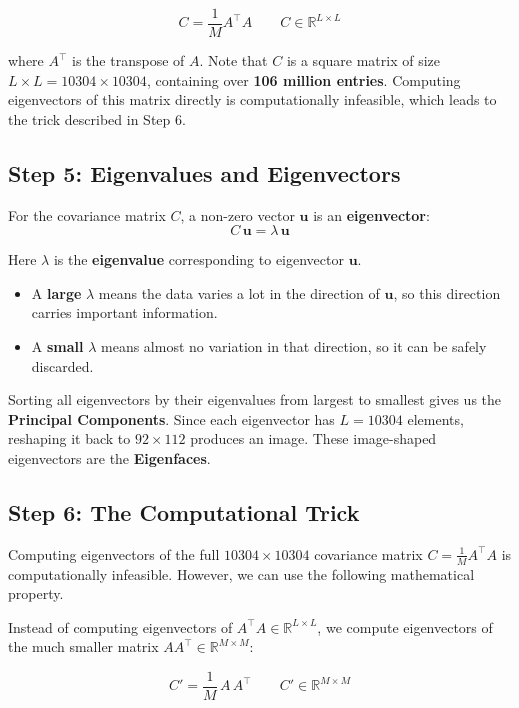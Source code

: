 \documentclass[12pt,a4paper]{article}
\begin{document}
\[
C = \frac{1}{M} A^\top A \qquad C \in \mathbb{R}^{L \times L}
\]

where $A^\top$ is the transpose of $A$. Note that $C$ is a square matrix of size
$L \times L = 10304 \times 10304$, containing over \textbf{106 million entries}.
Computing eigenvectors of this matrix directly is computationally infeasible,
which leads to the trick described in Step 6.

\subsection{Step 5: Eigenvalues and Eigenvectors}

For the covariance matrix $C$, a non-zero vector $\mathbf{u}$ is an
\textbf{eigenvector}:
\[
C\,\mathbf{u} = \lambda\,\mathbf{u}
\]

Here $\lambda$ is the \textbf{eigenvalue} corresponding to eigenvector $\mathbf{u}$.

\begin{itemize}
    \item A \textbf{large} $\lambda$ means the data varies a lot in the direction
          of $\mathbf{u}$, so this direction carries important information.
    \item A \textbf{small} $\lambda$ means almost no variation in that direction,
          so it can be safely discarded.
\end{itemize}

Sorting all eigenvectors by their eigenvalues from largest to smallest gives us
the \textbf{Principal Components}.
Since each eigenvector has $L = 10304$ elements, reshaping it back to $92 \times 112$
produces an image. These image-shaped eigenvectors are the \textbf{Eigenfaces}.

\subsection{Step 6: The Computational Trick}

Computing eigenvectors of the full $10304 \times 10304$ covariance matrix
$C = \frac{1}{M} A^\top A$ is computationally infeasible. However, we can use the
following mathematical property.

Instead of computing eigenvectors of $A^\top A \in \mathbb{R}^{L \times L}$,
we compute eigenvectors of the much smaller matrix $A A^\top \in \mathbb{R}^{M \times M}$:

\[
C' = \frac{1}{M}\, A\, A^\top \qquad C' \in \mathbb{R}^{M \times M}
\]
\end{document}
